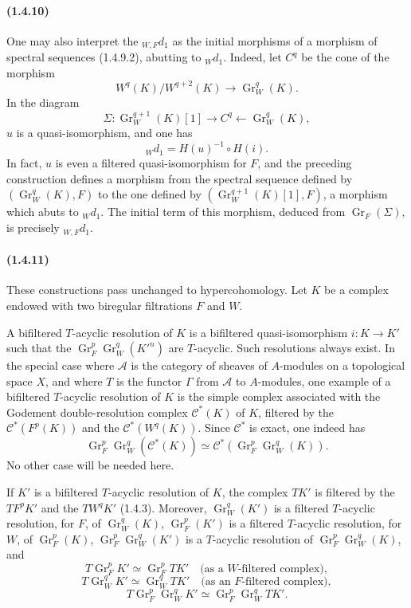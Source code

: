 \documentclass[10pt]{article}
\newcommand{\Gr}{\operatorname{Gr}}
\newcommand{\calA}{\mathcal A}
\begin{document}
\paragraph{(1.4.10)} One may also interpret the ${}_{W,F}d_1$ as the initial morphisms of a morphism of spectral sequences (1.4.9.2), abutting to ${}_Wd_1$. Indeed, let $C^q$ be the cone of the morphism
\[
W^q(K)/W^{q+2}(K)\longrightarrow\Gr_W^q(K).
\]
In the diagram
\[
\Sigma:\Gr_W^{q+1}(K)[1]\longrightarrow C^q\longleftarrow\Gr_W^q(K),
\]
$u$ is a quasi-isomorphism, and one has
\[
{}_Wd_1=H(u)^{-1}\circ H(i).
\]
In fact, $u$ is even a filtered quasi-isomorphism for $F$, and the preceding construction defines a morphism from the spectral sequence defined by $(\Gr_W^q(K),F)$ to the one defined by $(\Gr_W^{q+1}(K)[1],F)$, a morphism which abuts to ${}_Wd_1$. The initial term of this morphism, deduced from $\Gr_F(\Sigma)$, is precisely ${}_{W,F}d_1$.

\paragraph{(1.4.11)} These constructions pass unchanged to hypercohomology. Let $K$ be a complex endowed with two biregular filtrations $F$ and $W$.

A bifiltered $T$-acyclic resolution of $K$ is a bifiltered quasi-isomorphism $i:K\to K'$ such that the $\Gr_F^p\Gr_W^q(K'^n)$ are $T$-acyclic. Such resolutions always exist. In the special case where $\calA$ is the category of sheaves of $A$-modules on a topological space $X$, and where $T$ is the functor $\Gamma$ from $\calA$ to $A$-modules, one example of a bifiltered $T$-acyclic resolution of $K$ is the simple complex associated with the Godement double-resolution complex $\mathcal C^*(K)$ of $K$, filtered by the $\mathcal C^*(F^p(K))$ and the $\mathcal C^*(W^q(K))$. Since $\mathcal C^*$ is exact, one indeed has
\[
\Gr_F^p\Gr_W^q(\mathcal C^*(K))\simeq \mathcal C^*(\Gr_F^p\Gr_W^q(K)).
\]
No other case will be needed here.

If $K'$ is a bifiltered $T$-acyclic resolution of $K$, the complex $TK'$ is filtered by the $TF^pK'$ and the $TW^qK'$ (1.4.3). Moreover, $\Gr_W^q(K')$ is a filtered $T$-acyclic resolution, for $F$, of $\Gr_W^q(K)$, $\Gr_F^p(K')$ is a filtered $T$-acyclic resolution, for $W$, of $\Gr_F^p(K)$, $\Gr_F^p\Gr_W^q(K')$ is a $T$-acyclic resolution of $\Gr_F^p\Gr_W^q(K)$, and
\[
T\Gr_F^pK'\simeq\Gr_F^pTK'\quad\text{(as a $W$-filtered complex)},
\]
\[
T\Gr_W^qK'\simeq\Gr_W^qTK'\quad\text{(as an $F$-filtered complex)},
\]
\[
T\Gr_F^p\Gr_W^qK'\simeq\Gr_F^p\Gr_W^qTK'.
\]
\end{document}
